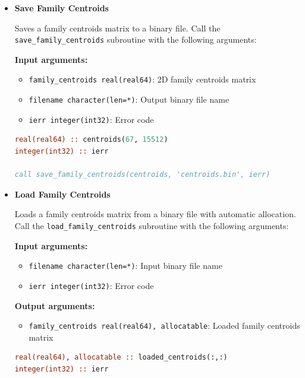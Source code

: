 \documentclass[11pt]{article}
\begin{document}
\begin{enumerate}
\begin{itemize}
\begin{lstlisting}[language=Fortran, caption={Load Family IDs}]
call load_family_ids(loaded_family_ids, 'family_ids.bin', ierr)
	      	      \end{lstlisting}
	      	      
	      	\item \textbf{Save Family Centroids}
	      	      
	      	      Saves a family centroids matrix to a binary file. Call the \texttt{save\_family\_centroids}
	      	      subroutine with the following arguments:
	      	      
	      	      \textbf{Input arguments:}
	      	      \begin{itemize}
	      	      	\item \texttt{family\_centroids real(real64)}: 2D family centroids matrix
	      	      	      
	      	      	\item \texttt{filename character(len=*)}: Output binary file name
	      	      	      
	      	      	\item \texttt{ierr integer(int32)}: Error code
	      	      \end{itemize}
	      	      \begin{lstlisting}[language=Fortran, caption={Save Family Centroids}]
real(real64) :: centroids(67, 15512)
integer(int32) :: ierr

call save_family_centroids(centroids, 'centroids.bin', ierr)
	      	      \end{lstlisting}
	      	      
	      	\item \textbf{Load Family Centroids}
	      	      
	      	      Loads a family centroids matrix from a binary file with automatic allocation.
	      	      Call the \texttt{load\_family\_centroids} subroutine with the following
	      	      arguments:
	      	      
	      	      \textbf{Input arguments:}
	      	      \begin{itemize}
	      	      	\item \texttt{filename character(len=*)}: Input binary file name
	      	      	      
	      	      	\item \texttt{ierr integer(int32)}: Error code
	      	      \end{itemize}
	      	      \textbf{Output arguments:}
	      	      \begin{itemize}
	      	      	\item \texttt{family\_centroids real(real64), allocatable}: Loaded family
	      	      	      centroids matrix
	      	      \end{itemize}
	      	      \begin{lstlisting}[language=Fortran, caption={Load Family Centroids}]
real(real64), allocatable :: loaded_centroids(:,:)
integer(int32) :: ierr


\end{lstlisting}
\end{itemize}
\end{enumerate}
\end{document}
